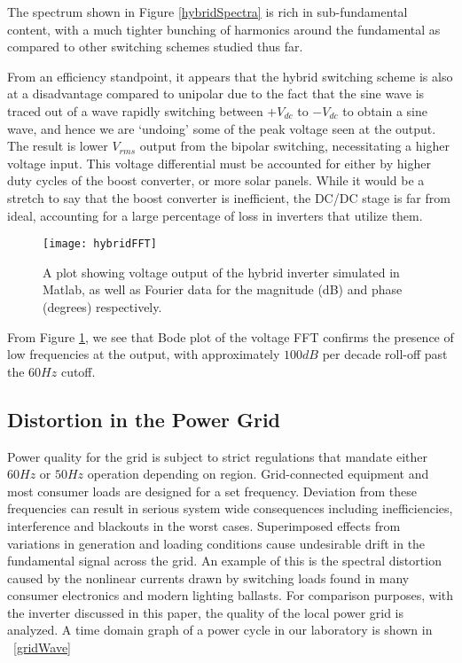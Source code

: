 The spectrum shown in Figure \ref{hybridSpectra} is rich in sub-fundamental content, with a much tighter bunching of harmonics around the fundamental as compared to other switching schemes studied thus far.

From an efficiency standpoint, it appears that the hybrid switching scheme is also at a disadvantage compared to unipolar due to the fact that the sine wave is traced out of a wave rapidly switching between $+V_{dc}$ to $-V_{dc}$ to obtain a sine wave, and hence we are `undoing' some of the peak voltage seen at the output. The result is lower $V_{rms}$ output from the bipolar switching, necessitating a higher voltage input. This voltage differential must be accounted for either by higher duty cycles of the boost converter, or more solar panels. While it would be a stretch to say that the boost converter is inefficient, the DC/DC stage is far from ideal, accounting for a large percentage of loss in inverters that utilize them. 

\begin{figure}[h]
\centering
\texttt{[image: hybridFFT]}
\caption{A plot showing voltage output of the hybrid inverter simulated in Matlab, as well as Fourier data for the magnitude (dB) and phase (degrees) respectively.}
\label{hybridFFT}
\end{figure}

From Figure \ref{hybridFFT}, we see that Bode plot of the voltage FFT confirms the presence of low frequencies at the output, with approximately $100dB$ per decade roll-off past the $60Hz$ cutoff. 

\subsection{Distortion in the Power Grid}
Power quality for the grid is subject to strict regulations that mandate either $60 Hz$ or $50 Hz$ operation depending on region. Grid-connected equipment and most consumer loads are designed for a set frequency. Deviation from these frequencies can result in serious system wide consequences including inefficiencies, interference and blackouts in the worst cases. Superimposed effects from variations in generation and loading conditions cause undesirable drift in the fundamental signal across the grid. An example of this is the spectral distortion caused by the nonlinear currents drawn by switching loads found in many consumer electronics and modern lighting ballasts. For comparison purposes, with the inverter discussed in this paper, the quality of the local power grid is analyzed. A time domain graph of a power cycle in our laboratory is shown in ~\ref{gridWave} 

